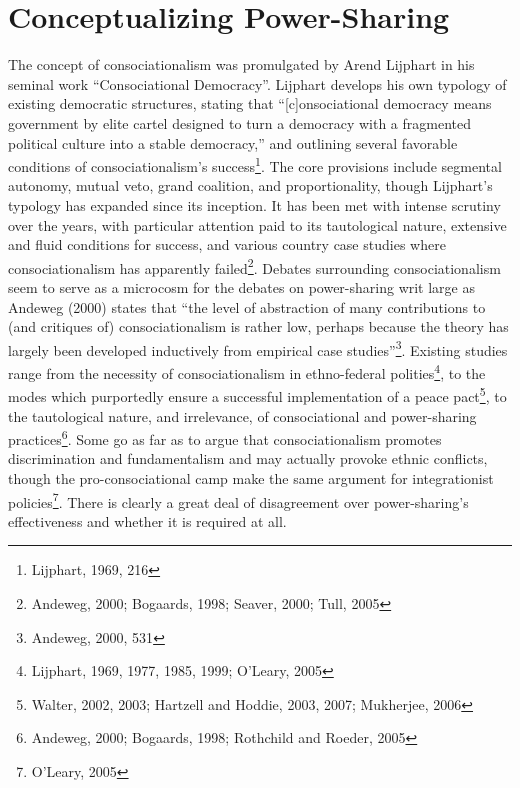 \documentclass[12pt]{article}
\begin{document}
\section{Conceptualizing Power-Sharing} 
The concept of consociationalism was promulgated by Arend Lijphart in his seminal work ``Consociational Democracy''. Lijphart develops his own typology of existing democratic structures, stating that ``[c]onsociational democracy means government by elite cartel designed to turn a democracy with a fragmented political culture into a stable democracy,'' and outlining several favorable conditions of consociationalism’s success\footnote{Lijphart, 1969, 216}. The core provisions include segmental autonomy, mutual veto, grand coalition, and proportionality, though Lijphart's typology has expanded since its inception. It has been met with intense scrutiny over the years, with particular attention paid to its tautological nature, extensive and fluid conditions for success, and various country case studies where consociationalism has apparently failed\footnote{Andeweg, 2000; Bogaards, 1998; Seaver, 2000; Tull, 2005}. Debates surrounding consociationalism seem to serve as a microcosm for the debates on power-sharing writ large as Andeweg (2000) states that ``the level of abstraction of many contributions to (and critiques of) consociationalism is rather low, perhaps because the theory has largely been developed inductively from empirical case studies''\footnote{Andeweg, 2000, 531}. Existing studies range from the necessity of consociationalism in ethno-federal polities\footnote{Lijphart, 1969, 1977, 1985, 1999; O’Leary, 2005}, to the modes which purportedly ensure a successful implementation of a peace pact\footnote{Walter, 2002, 2003; Hartzell and Hoddie, 2003, 2007; Mukherjee, 2006}, to the tautological nature, and irrelevance, of consociational and power-sharing practices\footnote{Andeweg, 2000; Bogaards, 1998; Rothchild and Roeder, 2005}. Some go as far as to argue that consociationalism promotes discrimination and fundamentalism and may actually provoke ethnic conflicts, though the pro-consociational camp make the same argument for integrationist policies\footnote{O’Leary, 2005}. There is clearly a great deal of disagreement over power-sharing’s effectiveness and whether it is required at all. 
\end{document}
